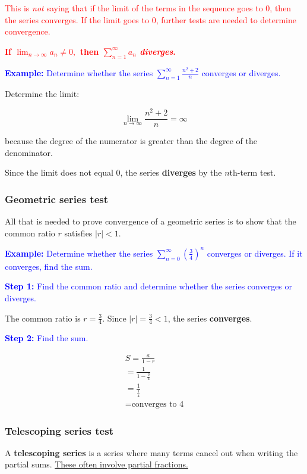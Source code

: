 \documentclass[letterpaper, 12pt]{article}
\newcommand{\example}[1]{\textcolor{blue}{\textbf{Example:} #1}}
\newcommand{\step}[2]{\textcolor{blue}{\textbf{Step #1:} #2}}
\begin{document}
\textcolor{red}{This is \textit{not} saying that if the limit of the terms in the sequence goes to 0, then the series converges. If the limit goes to 0, further tests are needed to determine convergence.}

\textcolor{red}{\textbf{If $\displaystyle \lim_{n \to \infty} a_n \neq 0,$ then $\displaystyle \sum_{n=1}^\infty a_n$ \textit{diverges}.}}

\example{Determine whether the series $\displaystyle \sum_{n=1}^\infty \frac{n^2 + 2}{n}$ converges or diverges.}

Determine the limit:

$$\lim_{n \to \infty} \frac{n^2 + 2}{n} = \infty$$

because the degree of the numerator is greater than the degree of the denominator.

Since the limit does not equal 0, the series \textbf{diverges} by the $n$th-term test.

\subsubsection*{Geometric series test}

All that is needed to prove convergence of a geometric series is to show that the common ratio $r$ satisfies $|r| < 1$.

\example{Determine whether the series $\displaystyle \sum_{n=0}^\infty \left(\frac{3}{4}\right)^n$ converges or diverges. If it converges, find the sum.}

\step{1}{Find the common ratio and determine whether the series converges or diverges.}

The common ratio is $r = \displaystyle \frac{3}{4}$. Since $|r| = \displaystyle \frac{3}{4} < 1$, the series \textbf{converges}.

\step{2}{Find the sum.}

\begin{gather*}
S = \frac{a}{1-r} \\
= \frac{1}{1 - \frac{3}{4}} \\
= \frac{1}{\frac{1}{4}} \\
= \boxed{\text{converges to 4}}
\end{gather*}

\subsubsection*{Telescoping series test}

A \textbf{telescoping series} is a series where many terms cancel out when writing the partial sums. \underline{These often involve partial fractions.}
\end{document}
